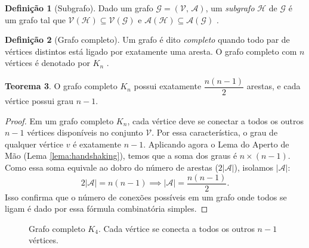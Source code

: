 \documentclass[
  12pt,
  oneside,
  a4paper,
  english,
  brazilian
  ]{abntex2}
\theoremstyle{definition}
\newtheorem{definicao}{Definição}[chapter]
\newtheorem{teorema}[definicao]{Teorema}
\begin{document}
\begin{definicao}[Subgrafo]
  Dado um grafo $\mathcal{G} = (\mathcal{V},\, \mathcal{A})$, um
  \textit{subgrafo} $\mathcal{H}$ de $\mathcal{G}$ é um grafo tal que
  $\mathcal{V}(\mathcal{H}) \subseteq \mathcal{V}(\mathcal{G})$ e
  $\mathcal{A}(\mathcal{H}) \subseteq \mathcal{A}(\mathcal{G})$
  \cite{wilson1996}. 
\end{definicao}

\begin{definicao}[Grafo completo]
\label{def:completo}
  Um grafo é dito \textit{completo} quando todo par de vértices distintos está
  ligado por exatamente uma aresta. O grafo completo com $n$ vértices é
  denotado por $K_n$ \cite{bondy1976}.
\end{definicao}

\begin{teorema}
  O grafo completo $K_n$ possui exatamente $\dfrac{n(n-1)}{2}$ arestas, e
  cada vértice possui grau $n - 1$.
\end{teorema}

\begin{proof}
  Em um grafo completo $K_n$, cada vértice deve se conectar a todos os outros $n-1$ vértices disponíveis no conjunto $\mathcal{V}$. Por essa característica, o grau de qualquer vértice $v$ é exatamente $n-1$. Aplicando agora o Lema do Aperto de Mão (Lema \ref{lema:handshaking}), temos que a soma dos graus é $n \times (n-1)$. Como essa soma equivale ao dobro do número de arestas ($2|\mathcal{A}|$), isolamos $|\mathcal{A}|$:
  \[
    2|\mathcal{A}| = n(n-1) \implies |\mathcal{A}| = \frac{n(n-1)}{2}.
  \]
  Isso confirma que o número de conexões possíveis em um grafo onde todos se ligam é dado por essa fórmula combinatória simples.
\end{proof}

\begin{figure}[htbp]
    \centering
    \caption{Grafo completo $K_4$. Cada vértice se conecta a todos os outros $n-1$ vértices.}
    \label{fig:grafo_completo}
\end{figure}
\end{document}
